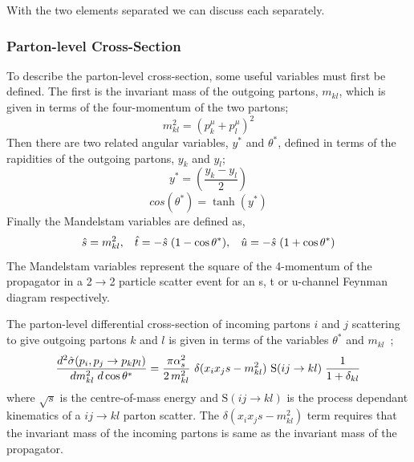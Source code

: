 \noindent
With the two elements separated we can discuss each separately.

\subsubsection{Parton-level Cross-Section}
\label{sec:theo-qcd_dijet_xs}

To describe the parton-level cross-section, some useful variables must first be defined.
The first is the invariant mass of the outgoing partons, $m_{kl}$, which is given in terms of the four-momentum of the two partons;
\begin{equation}
  m_{kl}^2 = (p^\mu_k + p^\mu_l)^2  
\end{equation}
\noindent
Then there are two related angular variables, $y^*$ and $\theta^*$,
defined in terms of the rapidities of the outgoing partons, $y_k$ and $y_l$;
\begin{equation}
  y^* = (\frac{y_k - y_l}{2})
\end{equation}
\begin{equation}
  cos(\theta^*) = \tanh(y^*)
\end{equation}
\noindent
Finally the Mandelstam variables are defined as, %
\begin{equation}
  \hat{s} = m_{kl}^2, \hspace{3mm}  \hat{t} = -\hat{s}\hspace{1mm}(1 - \cos{\theta^*}), \hspace{3mm} \hat{u} = - \hat{s}\hspace{1mm}(1+\cos{\theta^*})
  \label{eqn:theo-mandy}
\end{equation}
The Mandelstam variables represent the square of the 4-momentum of the propagator in a 2$\to$2 particle scatter event
for an s, t or u-channel Feynman diagram respectively.

\noindent
The parton-level differential cross-section of incoming partons $i$ and $j$ scattering to give
outgoing partons $k$ and $l$ is given in terms of the variables $\theta^*$ and $m_{kl}$~\cite{theo-qcd_xs};
\begin{equation}
  \frac{d^2 \hat{\sigma}(p_i, p_j \to p_k p_l)}{dm_{kl}^{2}\hspace{1mm}d\cos{\theta^*}} = \frac{ \pi \alpha_s^2}{2 \,  m_{kl}^2}
  \ \delta(x_i x_j s - m_{kl}^{2})\ \text{S}(ij \to kl) \hspace{1mm} \frac{1}{1+\delta_{kl}}
  \label{eq:theo-qcd_dijet_xs}
\end{equation}
where $\sqrt{s}$ is the centre-of-mass energy and $\text{S}(ij \to kl)$ is the process dependant kinematics of a $ij \to kl$ parton scatter.
The $\delta(x_i x_j s - m_{kl}^{2})$ term requires that the invariant mass of the incoming partons is same as the invariant mass of the propagator.

